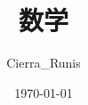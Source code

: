 \documentclass[
  UTF8, openany, 10pt,
  a4paper, oneside, fontset=none
]{ctexbook}
\title{{\Huge{\textbf{数学}}}}
\author{Cierra\_Runis}
\date{\today}
\begin{document}
  \frontmatter
  \maketitle
  

  \mainmatter
  \hypertarget{footlinkcontent}{}
  \tableofcontents
  

  \backmatter
  
  
\end{document}
